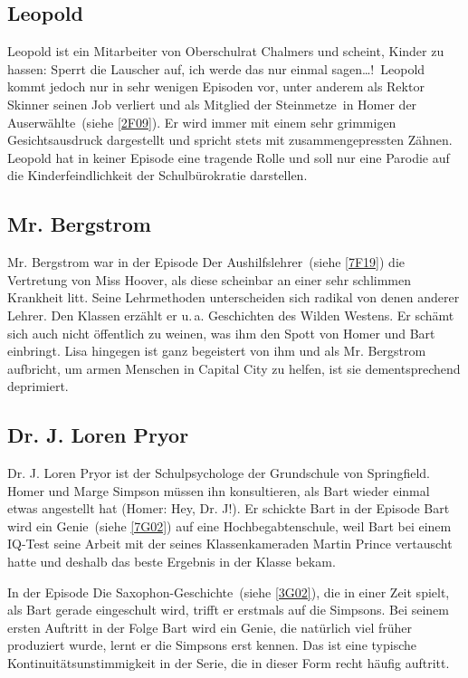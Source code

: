 \subsection{Leopold}
Leopold ist ein Mitarbeiter von Oberschulrat Chalmers und scheint, Kinder zu hassen: \glqq Sperrt die Lauscher auf, ich werde das nur einmal sagen\dots !\grqq\ Leopold kommt jedoch nur in sehr wenigen Episoden vor, unter anderem als Rektor Skinner seinen Job verliert und als Mitglied der \glqq Steinmetze\grqq\ in \glqq Homer der Auserwählte\grqq\ (siehe \ref{2F09}). Er wird immer mit einem sehr grimmigen Gesichtsausdruck dargestellt und spricht stets mit zusammengepressten Zähnen. Leopold hat in keiner Episode eine tragende Rolle und soll nur eine Parodie auf die Kinderfeindlichkeit der Schulbürokratie darstellen.

\subsection{Mr. Bergstrom}
Mr. Bergstrom war in der Episode \glqq Der Aushilfslehrer\grqq\ (siehe \ref{7F19}) die Vertretung von Miss Hoover, als diese scheinbar an einer sehr schlimmen Krankheit litt. Seine Lehrmethoden unterscheiden sich radikal von denen anderer Lehrer. Den Klassen erzählt er u.\,a. Geschichten des Wilden Westens. Er schämt sich auch nicht öffentlich zu weinen, was ihm den Spott von Homer und Bart einbringt. Lisa hingegen ist ganz begeistert von ihm und als Mr. Bergstrom aufbricht, um armen Menschen in Capital City zu helfen, ist sie dementsprechend deprimiert.

\subsection{Dr. J. Loren Pryor}
Dr. J. Loren Pryor ist der Schulpsychologe der Grundschule von Springfield. Homer und Marge Simpson müssen ihn konsultieren, als Bart wieder einmal etwas angestellt hat (Homer: \glqq Hey, Dr. J!\grqq ). Er schickte Bart in der Episode \glqq Bart wird ein Genie\grqq\ (siehe \ref{7G02}) auf eine Hochbegabtenschule, weil Bart bei einem IQ-Test seine Arbeit mit der seines Klassenkameraden Martin Prince vertauscht hatte und deshalb das beste Ergebnis in der Klasse bekam.

In der Episode \glqq Die Saxophon-Geschichte\grqq\ (siehe \ref{3G02}), die in einer Zeit spielt, als Bart gerade eingeschult wird, trifft er erstmals auf die Simpsons. Bei seinem ersten Auftritt in der Folge \glqq Bart wird ein Genie\grqq , die natürlich viel früher produziert wurde, lernt er die Simpsons erst kennen. Das ist eine typische Kontinuitätsunstimmigkeit in der Serie, die in dieser Form recht häufig auftritt.


